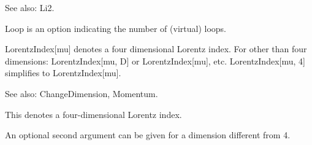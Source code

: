 See also: Li2.












Loop is an option indicating the number of (virtual) loops.



LorentzIndex[mu] denotes a four dimensional Lorentz index. For other than four dimensions: LorentzIndex[mu, D] or LorentzIndex[mu], etc.
  LorentzIndex[mu, 4] simplifies to LorentzIndex[mu].

See also:  ChangeDimension, Momentum.


This denotes a four-dimensional Lorentz index.



An optional second argument can be given for a dimension different from 4.




\dispSFoutmath{
\alpha
}


\dispSFoutmath{
\alpha
}


